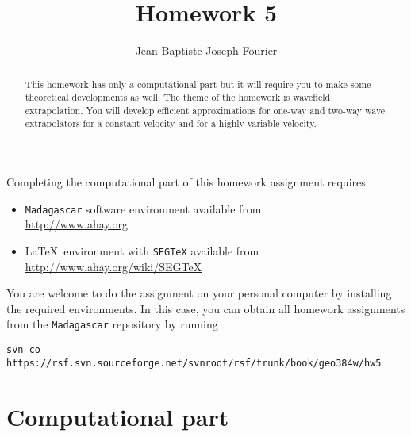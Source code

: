 \author{Jean Baptiste Joseph Fourier} 
\title{Homework 5}

\begin{abstract}
  This homework has only a computational part but it will require you
  to make some theoretical developments as well.  The theme of the
  homework is wavefield extrapolation. You will develop efficient
  approximations for one-way and two-way wave extrapolators for a
  constant velocity and for a highly variable velocity.
\end{abstract}

Completing the computational part of this homework assignment requires
\begin{itemize}
\item \texttt{Madagascar} software environment available from \\
  \url{http://www.ahay.org}
\item \LaTeX\ environment with \texttt{SEGTeX} available from \\ 
  \url{http://www.ahay.org/wiki/SEGTeX}
\end{itemize}

You are welcome to do the assignment on your personal computer by
installing the required environments. In this case, you can obtain all
homework assignments from the \texttt{Madagascar} repository by running
\begin{verbatim}
svn co https://rsf.svn.sourceforge.net/svnroot/rsf/trunk/book/geo384w/hw5 
\end{verbatim}

\section{Computational part}

